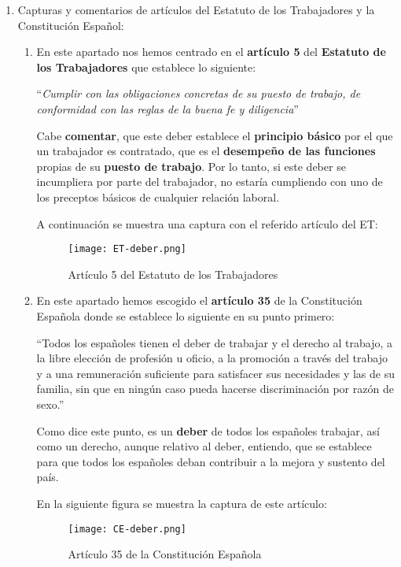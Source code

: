 \begin{enumerate}
    \item Capturas y comentarios de artículos del Estatuto de los Trabajadores y la Constitución Español:
    \begin{enumerate}
        \item En este apartado nos hemos centrado en el \textbf{artículo 5} del \textbf{Estatuto de los Trabajadores} que establece lo siguiente:

        ``\textit{Cumplir con las obligaciones concretas de su puesto de trabajo, de conformidad con las reglas de la buena fe y diligencia}'' \cite{rd2015}

        Cabe \textbf{comentar}, que este deber establece el \textbf{principio básico} por el que un trabajador es contratado, que es el \textbf{desempeño de las funciones} propias de su \textbf{puesto de trabajo}. Por lo tanto, si este deber se incumpliera por parte del trabajador, no estaría cumpliendo con uno de los preceptos básicos de cualquier relación laboral.

        A continuación se muestra una captura con el referido artículo del ET:

        \begin{figure}[ht]
            \centering
            \texttt{[image: ET-deber.png]}
            \caption{Artículo 5 del Estatuto de los Trabajadores}
        \end{figure}

        \item En este apartado hemos escogido el \textbf{artículo 35} de la Constitución Española donde se establece lo siguiente en su punto primero:

        ``Todos los españoles tienen el deber de trabajar y el derecho al trabajo, a la libre elección de profesión u oficio, a la promoción a través del trabajo y a una remuneración suficiente para satisfacer sus necesidades y las de su familia, sin que en ningún caso pueda hacerse discriminación por razón de sexo.'' \cite{const}

        Como dice este punto, es un \textbf{deber} de todos los españoles trabajar, así como un derecho, aunque relativo al deber, entiendo, que se establece para que todos los españoles deban contribuir a la mejora y sustento del país.

        En la siguiente figura se muestra la captura de este artículo:

                \begin{figure}[ht]
            \centering
            \texttt{[image: CE-deber.png]}
            \caption{Artículo 35 de la Constitución Española}
        \end{figure}
    \end{enumerate}


\end{enumerate}
